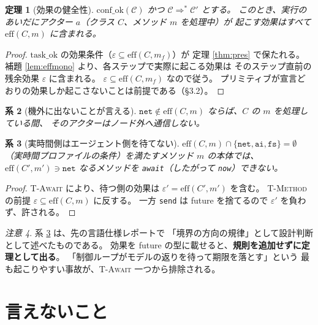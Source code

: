\documentclass[11pt,a4paper]{ltjsarticle}
\newtheorem{theorem}{定理}
\newtheorem{corollary}[theorem]{系}
\theoremstyle{definition}
\theoremstyle{remark}
\newtheorem{remark}[theorem]{注意}
\newcommand{\meff}{\mathrm{eff}}
\newcommand{\taskok}{\mathrm{task\_ok}}
\newcommand{\confok}{\mathrm{conf\_ok}}
\newcommand{\cstep}{\Longrightarrow}
\begin{document}
\begin{theorem}[効果の健全性]
\label{thm:effsound}
$\confok(\mathcal{C})$ かつ $\mathcal{C} \cstep^{*} \mathcal{C}'$ とする。
このとき、実行のあいだにアクター $a$（クラス $C$、メソッド $m$ を処理中）が
起こす効果はすべて $\meff(C,m)$ に含まれる。
\end{theorem}

\begin{proof}
$\taskok$ の効果条件（$\varepsilon \subseteq \meff(C,m_f)$）が
定理 \ref{thm:pres} で保たれる。
補題 \ref{lem:effmono} より、各ステップで実際に起こる効果は
そのステップ直前の残余効果 $\varepsilon$ に含まれる。
$\varepsilon \subseteq \meff(C,m_f)$ なので従う。
プリミティブが宣言どおりの効果しか起こさないことは前提である（\S 3.2）。
\end{proof}

\begin{corollary}[機外に出ないことが言える]
$\mathtt{net} \notin \meff(C,m)$ ならば、$C$ の $m$ を処理している間、
そのアクターはノード外へ通信しない。
\end{corollary}

\begin{corollary}[実時間側はエージェント側を待てない]
\label{cor:boundary}
$\meff(C,m) \cap \{\mathtt{net},\mathtt{ai},\mathtt{fs}\} = \emptyset$
（実時間プロファイルの条件）を満たすメソッド $m$ の本体では、
$\meff(C',m') \ni \mathtt{net}$ なるメソッドを
\texttt{await}（したがって \texttt{now}）できない。
\end{corollary}

\begin{proof}
\textsc{T-Await} により、待つ側の効果は
$\varepsilon' = \meff(C',m')$ を含む。
\textsc{T-Method} の前提 $\varepsilon \subseteq \meff(C,m)$ に反する。
一方 \texttt{send} は future を捨てるので $\varepsilon'$ を負わず、許される。
\end{proof}

\begin{remark}
系 \ref{cor:boundary} は、先の言語仕様レポートで
「境界の方向の規律」として設計判断として述べたものである。
効果を future の型に載せると、\textbf{規則を追加せずに定理として出る}。
「制御ループがモデルの返りを待って期限を落とす」という
最も起こりやすい事故が、\textsc{T-Await} 一つから排除される。
\end{remark}

\section{言えないこと}
\end{document}
